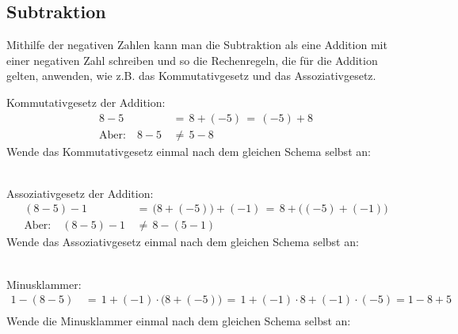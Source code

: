\subsection{Subtraktion}
Mithilfe der negativen Zahlen kann man die Subtraktion als eine Addition mit einer negativen Zahl schreiben und so die Rechenregeln, die für die Addition gelten, anwenden, wie z.B. das Kommutativgesetz und das Assoziativgesetz.
\begin{example} Kommutativgesetz der Addition:
	\begin{align*}
					8 - 5		&\,=\, 8 + (-5) \,=\, (-5) + 8\\
		\text{Aber:}\quad 8 - 5		&\,\neq\, 5 - 8
	\end{align*}
	Wende das Kommutativgesetz einmal nach dem gleichen Schema selbst an:\\
	\\
\end{example}
\begin{example} Assoziativgesetz der Addition:
	\begin{align*}
					(8 - 5) - 1			&\,=\, \bigl(8 + (-5)\bigr) + (-1) \,=\, 8 + \bigl( (-5) + (-1)\bigr)\\
		\text{Aber:}\quad (8 - 5) - 1	&\,\neq\, 8 - (5 - 1)
	\end{align*}
	Wende das Assoziativgesetz einmal nach dem gleichen Schema selbst an:\\
	\\
\end{example}
\begin{example} Minusklammer:
	\begin{align*}
					1 -(8 - 5)			&\,=\, 1 + (-1)\cdot\bigl(8 + (-5)\bigr)\,=\, 1 + (-1)\cdot 8 + (-1)\cdot (-5) = 1 - 8 + 5\\
	\end{align*}
	Wende die Minusklammer einmal nach dem gleichen Schema selbst an:\\
	\\
\end{example}


